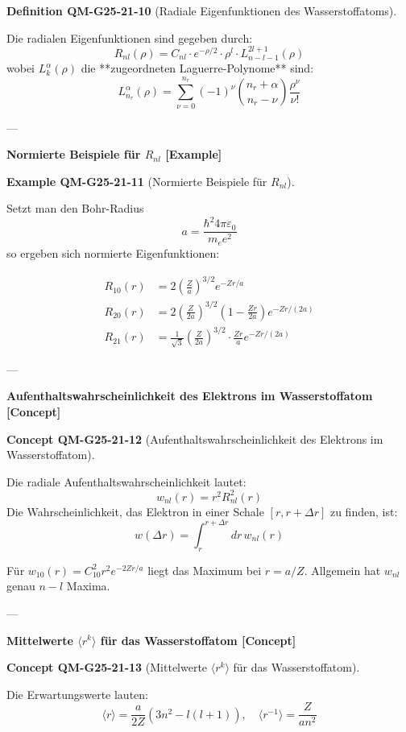 \documentclass[10pt, letterpaper]{article}
\newcommand{\CustomHeading}[3]{%
  \par\medskip\noindent%
  \textbf{#1 #2} \textnormal{(#3)}.\enskip%
}
\newenvironment{DEF}[2]{\begin{unitbox}\CustomHeading{Definition}{#1}{#2}}{\end{unitbox}}
\newenvironment{EXA}[2]{\begin{unitbox}\CustomHeading{Example}{#1}{#2}}{\end{unitbox}}
\newenvironment{CONC}[2]{\begin{unitbox}\CustomHeading{Concept}{#1}{#2}}{\end{unitbox}}
\begin{document}
\begin{DEF}{QM-G25-21-10}{Radiale Eigenfunktionen des Wasserstoffatoms}
Die radialen Eigenfunktionen sind gegeben durch:
\[
R_{nl}(\rho) = C_{nl} \cdot e^{-\rho/2} \cdot \rho^l \cdot L_{n-l-1}^{2l+1}(\rho)
\]
wobei $L_k^\alpha(\rho)$ die **zugeordneten Laguerre-Polynome** sind:
\[
L_{n_r}^\alpha(\rho) = \sum_{\nu=0}^{n_r} (-1)^\nu \binom{n_r + \alpha}{n_r - \nu} \frac{\rho^\nu}{\nu!}
\]
\end{DEF}

---

\textbf{Normierte Beispiele für $R_{nl}$ [Example]}

\begin{EXA}{QM-G25-21-11}{Normierte Beispiele für $R_{nl}$}
Setzt man den Bohr-Radius
\[
a = \frac{\hbar^2 4 \pi \varepsilon_0}{m_e e^2}
\]
so ergeben sich normierte Eigenfunktionen:

\[
\begin{aligned}
R_{10}(r) &= 2 \left( \frac{Z}{a} \right)^{3/2} e^{-Zr/a} \\
R_{20}(r) &= 2 \left( \frac{Z}{2a} \right)^{3/2} \left(1 - \frac{Zr}{2a} \right) e^{-Zr/(2a)} \\
R_{21}(r) &= \frac{1}{\sqrt{3}} \left( \frac{Z}{2a} \right)^{3/2} \cdot \frac{Zr}{a} e^{-Zr/(2a)}
\end{aligned}
\]
\end{EXA}

---

\textbf{Aufenthaltswahrscheinlichkeit des Elektrons im Wasserstoffatom [Concept]}

\begin{CONC}{QM-G25-21-12}{Aufenthaltswahrscheinlichkeit des Elektrons im Wasserstoffatom}
Die radiale Aufenthaltswahrscheinlichkeit lautet:
\[
w_{nl}(r) = r^2 R_{nl}^2(r)
\]
Die Wahrscheinlichkeit, das Elektron in einer Schale $[r, r+\Delta r]$ zu finden, ist:
\[
w(\Delta r) = \int_r^{r+\Delta r} dr \, w_{nl}(r)
\]

Für $w_{10}(r) = C_{10}^2 r^2 e^{-2Zr/a}$ liegt das Maximum bei $r = a/Z$. Allgemein hat $w_{nl}$ genau $n - l$ Maxima.
\end{CONC}

---

\textbf{Mittelwerte $\langle r^k \rangle$ für das Wasserstoffatom [Concept]}

\begin{CONC}{QM-G25-21-13}{Mittelwerte $\langle r^k \rangle$ für das Wasserstoffatom}
Die Erwartungswerte lauten:
\[
\langle r \rangle = \frac{a}{2Z}(3n^2 - l(l+1)), \quad \langle r^{-1} \rangle = \frac{Z}{a n^2}
\]
\end{CONC}
\end{document}
